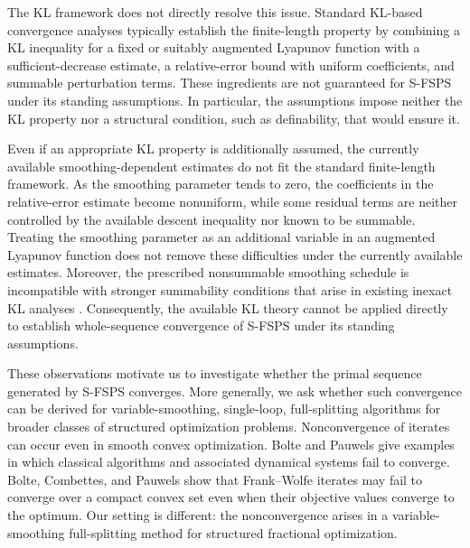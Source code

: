 \documentclass[11pt]{article}
\numberwithin{equation}{section}
\begin{document}
The KL framework \cite{AB,ABS,Sun1} does not directly resolve this
issue. Standard KL-based convergence analyses typically establish
the finite-length property by combining a KL inequality for a fixed
or suitably augmented Lyapunov function with a sufficient-decrease
estimate, a relative-error bound with uniform coefficients, and
summable perturbation terms. These ingredients are not guaranteed
for S-FSPS under its standing assumptions. In particular, the
assumptions impose neither the KL property nor a structural
condition, such as definability, that would ensure it.

Even if an appropriate KL property is additionally assumed, the
currently available smoothing-dependent estimates do not fit the
standard finite-length framework. As the smoothing parameter tends
to zero, the coefficients in the relative-error estimate become
nonuniform, while some residual terms are neither controlled by the
available descent inequality nor known to be summable. Treating the
smoothing parameter as an additional variable in an augmented
Lyapunov function does not remove these difficulties under the
currently available estimates. Moreover, the prescribed
nonsummable smoothing schedule is incompatible with stronger
summability conditions that arise in existing inexact KL analyses
\cite{Sun1}. Consequently, the available KL theory cannot be applied
directly to establish whole-sequence convergence of S-FSPS under its
standing assumptions.

These observations motivate us to investigate whether the primal sequence generated by S-FSPS converges. More generally, we ask whether such convergence
can be derived for variable-smoothing, single-loop, full-splitting algorithms
for broader classes of structured optimization problems.
Nonconvergence of iterates can occur even in smooth convex optimization. Bolte
and Pauwels \cite{BoltePauwels2021} give examples in which classical algorithms
and associated dynamical systems fail to converge. Bolte, Combettes, and
Pauwels \cite{BolteCombettesPauwels2024} show that Frank--Wolfe iterates may
fail to converge over a compact convex set even when their objective values
converge to the optimum. Our setting is different: the nonconvergence arises
in a variable-smoothing full-splitting method for structured fractional
optimization.
\end{document}
